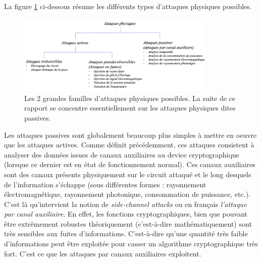 \documentclass[oneside]{book}
\begin{document}
\vspace{-0.3 cm}La figure \ref{fig:attaques} ci-dessous résume les différents types d'attaques physiques possibles.
\begin{figure}[htbp]
    \centering
    \includegraphics[width=0.85\textwidth]{image/attaques}
    \caption{Les 2 grandes familles d'attaques physiques possibles. La suite de ce rapport se concentre essentiellement sur les attaques physiques dites passives.}
    \label{fig:attaques}
\end{figure}

\vspace{-0.25 cm}Les attaques passives sont globalement beaucoup plus simples à mettre en oeuvre que les attaques actives. Comme définit précédemment, ces attaques consistent à analyser des données issues de canaux auxiliaires au device cryptographique (lorsque ce dernier est en état de fonctionnement normal). Ces canaux auxiliaires sont des canaux présents physiquement sur le circuit attaqué et le long desquels de l’information s’échappe (sous différentes formes : rayonnement électromagnétique, rayonnement photonique, consommation de puissance, etc.). C'est là qu'intervient la notion de \textit{side-channel attacks} ou en français \textit{l'attaque par canal auxiliaire}. 
En effet, les fonctions cryptographiques, bien que pouvant être extrêmement robustes théoriquement (c'est-à-dire mathématiquement) sont très sensibles aux fuites d’informations. C'est-à-dire qu'une quantité très faible d’informations peut être exploitée pour casser un algorithme cryptographique très fort. C’est ce que les attaques par canaux auxiliaires exploitent. 
\end{document}
